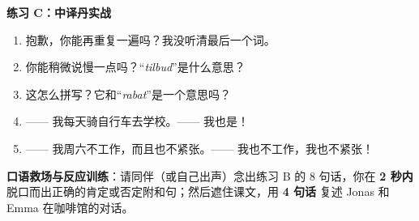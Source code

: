 \textbf{练习 C：中译丹实战}
\begin{enumerate}
  \item 抱歉，你能再重复一遍吗？我没听清最后一个词。
  \item 你能稍微说慢一点吗？“\textit{tilbud}”是什么意思？
  \item 这怎么拼写？它和“\textit{rabat}”是一个意思吗？
  \item —— 我每天骑自行车去学校。—— 我也是！
  \item —— 我周六不工作，而且也不紧张。—— 我也不工作，我也不紧张！
\end{enumerate}


\textbf{口语救场与反应训练}：请同伴（或自己出声）念出练习 B 的 8 句话，你在 \textbf{2 秒内} 脱口而出正确的肯定或否定附和句；然后遮住课文，用 \textbf{4 句话} 复述 Jonas 和 Emma 在咖啡馆的对话。

